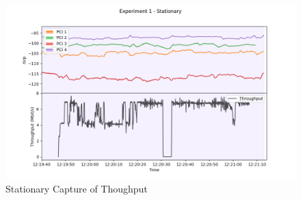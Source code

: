 \begin{figure}
    \centering
    \includegraphics[width=0.75\linewidth]{src//img/4enbEx1Stationary.png}
    \caption{Stationary Capture of Thoughput}
    \label{fig:real:4enb:stationary}
\end{figure}
